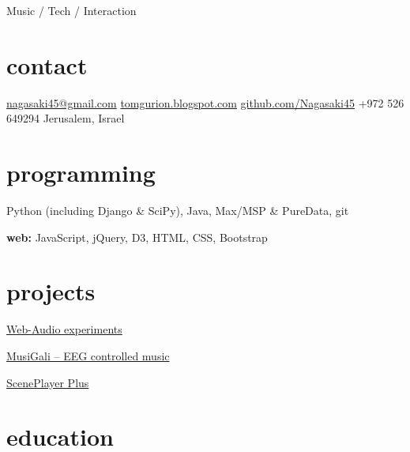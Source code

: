 \documentclass[]{friggeri-cv}  %
\begin{document}
       {Music / Tech / Interaction}


\begin{aside}
\section{contact}
\href{mailto:nagasaki45@gmail.com}{nagasaki45@gmail.com}
\href{http://tomgurion.blogspot.com}{tomgurion.blogspot.com}
\href{https://github.com/Nagasaki45}{github.com/Nagasaki45}
+972 526 649294
Jerusalem, Israel

\section{programming}
Python (including Django \& SciPy), Java, Max/MSP \& PureData, git

\textbf{web:}
JavaScript, jQuery, D3, HTML, CSS, Bootstrap

\section{projects}
\href{http://web-audio.nagasaki45.com/}{Web-Audio experiments}

\href{http://tomgurion.blogspot.co.il/2013/10/musigali-eeg-controlled-music-for-brain.html}{MusiGali -- EEG controlled music}

\href{https://play.google.com/store/apps/details?id=com.nagasaki45.sceneplayerplus}{ScenePlayer Plus}

\end{aside}


\section{education}
\end{document}
